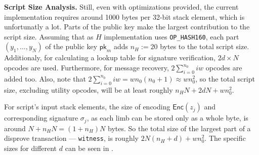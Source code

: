 \documentclass{iacrtrans}
\begin{document}
\textbf{Script Size Analysis.} Still, even with optimizations
provided, the current implementation requires around 1000 bytes per
32-bit stack element, which is unfortunatly a lot. Parts of the public
key make the largest contribution to the script size. Assuming that as
$H$ implementation uses \texttt{OP\_HASH160}, each part
$(y_1,\dots,y_N)$ of the public key $\mathsf{pk}_{m}$ adds $n_H := 20$ bytes to
the total script size. Additionaly, for calculating a lookup table for
signature verification, $2d \times N$ opcodes are used. Furthermore, for
message recovery, $2\sum_{i = 0}^{n_0} i w$ opcodes are added too. Also,
note that $2 \sum_{i = 0}^{n_0} i w = w n_0 (n_0+1) \approx w n_0^2$, so the
total script size, excluding utility opcodes, will be at least roughly
$n_H N + 2 dN + w n_0^2$.

For script's input stack elements, the size of encoding
$\mathsf{Enc}(z_j)$ and corresponding signature $\sigma_j$, as each limb
can be stored only as a whole byte, is around $N + n_H N = (1+n_H)N$
bytes. So the total size of the largest part of a disprove transaction
--- \texttt{witness}, is roughly $2N(n_H + d) + wn_0^2$. The specific sizes
for different $d$ can be seen in .
\end{document}
